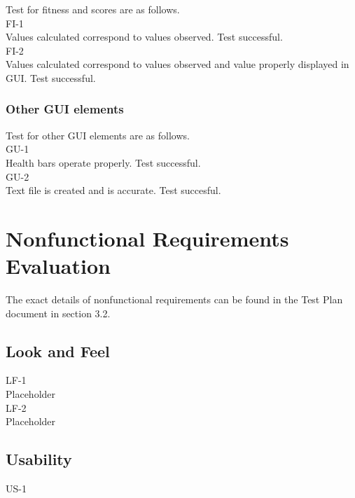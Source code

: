 \documentclass[12pt, titlepage]{article}
\begin{document}
Test for fitness and scores are as follows.\\

FI-1\\

Values calculated correspond to values observed. Test successful.\\

FI-2\\

Values calculated correspond to values observed and value properly displayed in GUI. Test successful.

\subsubsection{Other GUI elements}

Test for other GUI elements are as follows.\\

GU-1\\

Health bars operate properly. Test successful.\\

GU-2\\

Text file is created and is accurate. Test succesful.

\section{Nonfunctional Requirements Evaluation}

The exact details of nonfunctional requirements can be found in the Test Plan document in section 3.2.

\subsection{Look and Feel}

LF-1\\

Placeholder\\

LF-2\\

Placeholder

\subsection{Usability}

US-1\\
\end{document}
